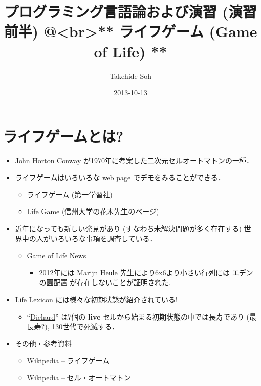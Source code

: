 \documentclass[a4j]{article}
\title{プログラミング言語論および演習 (演習前半) @<br>** ライフゲーム (Game of Life) **}
\author{Takehide Soh}
\date{2013-10-13}
\begin{document}
\maketitle


\section*{ライフゲームとは?}
\label{sec-1}

\begin{itemize}
\item John Horton Conway が1970年に考案した二次元セルオートマトンの一種．
\item ライフゲームはいろいろな web page でデモをみることができる．
\begin{itemize}
\item \href{http://www.daiichi-g.co.jp/osusume/forfun/07_lifegame/07.html}{ライフゲーム (第一学習社)}
\item \href{http://math.shinshu-u.ac.jp/~hanaki/lifegame/}{Life Game (信州大学の花木先生のページ)}
\end{itemize}
\item 近年になっても新しい発見があり (すなわち未解決問題が多く存在する) 世界中の人がいろいろな事項を調査している．
\begin{itemize}
\item \href{http://pentadecathlon.com/lifeNews/index.php}{Game of Life News}
\begin{itemize}
\item 2012年には Marijn Heule 先生により6x6より小さい行列には \href{http://ja.wikipedia.org/wiki/%E3%82%A8%E3%83%87%E3%83%B3%E3%81%AE%E5%9C%92%E9%85%8D%E7%BD%AE}{エデンの園配置} が存在しないことが証明された.
\end{itemize}
\end{itemize}
\item \href{http://www.argentum.freeserve.co.uk/lex.htm}{Life Lexicon} には様々な初期状態が紹介されている!
\begin{itemize}
\item ``\href{http://www.argentum.freeserve.co.uk/lex_d.htm#diehard}{Diehard}'' は7個の \textbf{live} セルから始まる初期状態の中では長寿であり (最長寿?), 130世代で死滅する．
\end{itemize}
\item その他・参考資料
\begin{itemize}
\item \href{http://ja.wikipedia.org/wiki/%E3%83%A9%E3%82%A4%E3%83%95%E3%82%B2%E3%83%BC%E3%83%A0}{Wikipedia -- ライフゲーム}
\item \href{http://math.shinshu-u.ac.jp/~hanaki/lifegame/}{Wikipedia -- セル・オートマトン}
\end{itemize}
\end{itemize}
\end{document}
